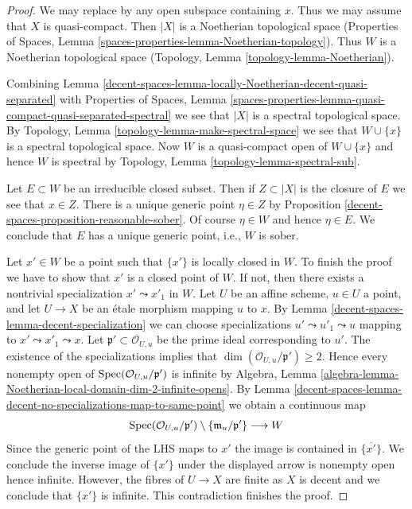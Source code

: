 \begin{proof}
We may replace by any open subspace containing $x$.
Thus we may assume that $X$ is quasi-compact.
Then $|X|$ is a Noetherian topological space
(Properties of Spaces, Lemma \ref{spaces-properties-lemma-Noetherian-topology}).
Thus $W$ is a Noetherian topological space
(Topology, Lemma \ref{topology-lemma-Noetherian}).

\medskip\noindent
Combining Lemma \ref{decent-spaces-lemma-locally-Noetherian-decent-quasi-separated} with
Properties of Spaces, Lemma
\ref{spaces-properties-lemma-quasi-compact-quasi-separated-spectral}
we see that $|X|$ is a spectral topological space.
By Topology, Lemma \ref{topology-lemma-make-spectral-space}
we see that $W \cup \{x\}$ is a spectral topological space.
Now $W$ is a quasi-compact open of $W \cup \{x\}$ and hence $W$ is
spectral by Topology, Lemma \ref{topology-lemma-spectral-sub}.

\medskip\noindent
Let $E \subset W$ be an irreducible closed subset. Then if $Z \subset |X|$
is the closure of $E$ we see that $x \in Z$. There is a unique generic
point $\eta \in Z$ by Proposition \ref{decent-spaces-proposition-reasonable-sober}.
Of course $\eta \in W$ and hence $\eta \in E$. We conclude that $E$
has a unique generic point, i.e., $W$ is sober.

\medskip\noindent
Let $x' \in W$ be a point such that $\{x'\}$ is locally closed in $W$.
To finish the proof we have to show that $x'$ is a closed point of $W$.
If not, then there exists a nontrivial specialization $x' \leadsto x'_1$
in $W$. Let $U$ be an affine scheme, $u \in U$ a point, and let $U \to X$
be an \'etale morphism mapping $u$ to $x$. By
Lemma \ref{decent-spaces-lemma-decent-specialization}
we can choose specializations $u' \leadsto u'_1 \leadsto u$
mapping to $x' \leadsto x'_1 \leadsto x$.
Let $\mathfrak p' \subset \mathcal{O}_{U, u}$ be the prime ideal
corresponding to $u'$. The existence of the specializations
implies that $\dim(\mathcal{O}_{U, u}/\mathfrak p') \geq 2$.
Hence every nonempty open of $\operatorname{Spec}(\mathcal{O}_{U, u}/\mathfrak p')$
is infinite by Algebra, Lemma
\ref{algebra-lemma-Noetherian-local-domain-dim-2-infinite-opens}.
By Lemma \ref{decent-spaces-lemma-decent-no-specializations-map-to-same-point}
we obtain a continuous map
$$
\operatorname{Spec}(\mathcal{O}_{U, u}/\mathfrak p')
\setminus \{\mathfrak m_u/\mathfrak p'\}
\longrightarrow
W
$$
Since the generic point of the LHS maps to $x'$ the image is
contained in $\overline{\{x'\}}$. We conclude the inverse image of $\{x'\}$
under the displayed arrow is nonempty open hence infinite.
However, the fibres of $U \to X$ are finite as $X$
is decent and we conclude that $\{x'\}$ is infinite.
This contradiction finishes the proof.
\end{proof}

